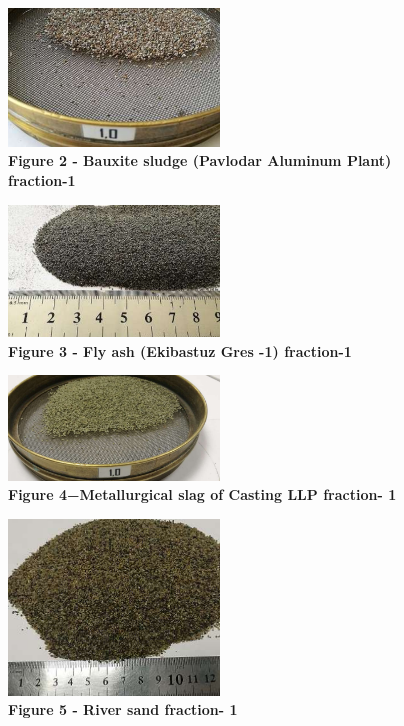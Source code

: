 \begin{figure}[H]
	\centering
	\includegraphics[width=0.5\textwidth]{assets/268}
	\caption*{\bfseries Figure 2 - Bauxite sludge (Pavlodar Aluminum Plant) fraction-1}
\end{figure}


\begin{figure}[H]
	\centering
	\includegraphics[width=0.5\textwidth]{assets/269}
	\caption*{\bfseries Figure 3 - Fly ash (Ekibastuz Gres -1) fraction-1}
\end{figure}



\begin{figure}[H]
	\centering
	\includegraphics[width=0.5\textwidth]{assets/270}
	\caption*{\bfseries Figure 4−Metallurgical slag of Casting LLP fraction- 1}
\end{figure}



\begin{figure}[H]
	\centering
	\includegraphics[width=0.5\textwidth]{assets/271}
	\caption*{\bfseries Figure 5 - River sand fraction- 1}
\end{figure}


